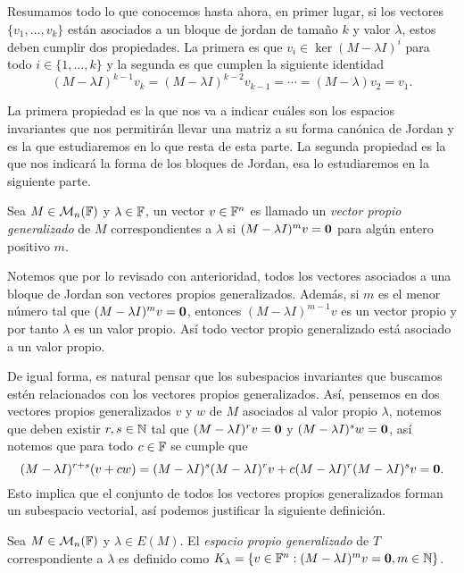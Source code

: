 Resumamos todo lo que conocemos hasta ahora, en primer lugar, si los vectores $\{v_1,\ldots,v_k\}$ están asociados a un bloque de jordan de tamaño $k$ y valor $\lambda$, estos deben cumplir dos propiedades. La primera es que $v_i \in \ker(M-\lambda I)^i$ para todo $i \in \{1,\ldots,k\}$ y la segunda es que cumplen la siguiente identidad
\[
  (M-\lambda I)^{k-1}v_k = (M-\lambda I)^{k-2}v_{k-1} = \cdots = (M-\lambda)v_2 = v_1.
\]

La primera propiedad es la que nos va a indicar cuáles son los espacios invariantes que nos permitirán llevar una matriz a su forma canónica de Jordan y es la que estudiaremos en lo que resta de esta parte. La segunda propiedad es la que nos indicará la forma de los bloques de Jordan, esa lo estudiaremos en la siguiente parte.

\begin{defi}
  Sea $M \in \mathcal{M}_n(\mathbb{F})$ y $\lambda \in \mathbb{F}$, un vector $v \in \mathbb{F}^n$ es llamado un \emph{vector propio generalizado} de $M$ correspondientes a $\lambda$ si $(M-\lambda I)^m v = \mathbf{0}$ para algún entero positivo $m$.
\end{defi}

Notemos que por lo revisado con anterioridad, todos los vectores asociados a una bloque de Jordan son vectores propios generalizados. Además, si $m$ es el menor número tal que $(M-\lambda I)^mv = \mathbf{0}$, entonces $(M-\lambda I)^{m-1}v$ es un vector propio y por tanto $\lambda$ es un valor propio. Así todo vector propio generalizado está asociado a un valor propio.

De igual forma, es natural pensar que los subespacios invariantes que buscamos estén relacionados con los vectores propios generalizados. Así, pensemos en dos vectores propios generalizados $v$ y $w$ de $M$ asociados al valor propio $\lambda$, notemos que deben existir $r, s \in \mathbb{N}$ tal que $(M-\lambda I)^r v = \mathbf{0}$ y $(M-\lambda I)^s w = \mathbf{0}$, así notemos que para todo $c\in\mathbb{F}$ se cumple que
\[
  (M-\lambda I)^{r+s}(v+cw) = (M-\lambda I)^s(M-\lambda I)^r v + c (M-\lambda I)^r (M-\lambda I)^sv = \mathbf{0}.
\]
Esto implica que el conjunto de todos los vectores propios generalizados forman un subespacio vectorial, así podemos justificar la siguiente definición.

\begin{defi}
  Sea $M \in \mathcal{M}_n(\mathbb{F})$ y $\lambda \in E(M)$. El \emph{espacio propio generalizado} de  $T$ correspondiente a $\lambda$ es definido como $K_\lambda = \{v \in \mathbb{F}^n : (M-\lambda I)^m v = \mathbf{0}, m \in \mathbb{N}\}$.
\end{defi}

